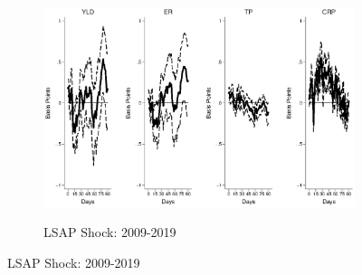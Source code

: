 \documentclass{article}
\begin{document}
\begin{figure}[tbph]
	\begin{subfigure}[t]{\textwidth}
		\begin{center}
			\includegraphics[trim={0cm 0cm 0cm 0cm},clip,height=0.26\textheight,width=1\textwidth]{../Figures/LPs/LagDep-FX/LSAP/AE/LSAPAEnomyptpphi24m.eps} \\
			\caption{LSAP Shock: 2009-2019} \label{subfig:LPAE2Ylsap}
		\end{center}
	\end{subfigure}

\end{figure}

\pagebreak[4]
\end{document}
